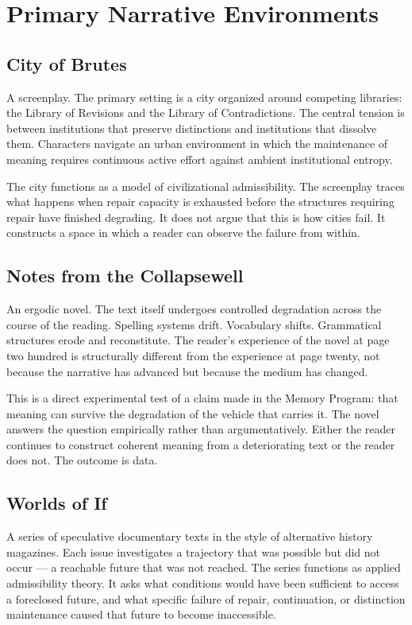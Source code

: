 \documentclass[12pt, openany]{book}
\begin{document}
\section{Primary Narrative Environments}

\subsection{City of Brutes} A screenplay. The primary setting is a city
organized around competing libraries: the Library of Revisions and the
Library of Contradictions. The central tension is between institutions that
preserve distinctions and institutions that dissolve them. Characters
navigate an urban environment in which the maintenance of meaning requires
continuous active effort against ambient institutional entropy.

The city functions as a model of civilizational admissibility. The
screenplay traces what happens when repair capacity is exhausted before
the structures requiring repair have finished degrading. It does not
argue that this is how cities fail. It constructs a space in which a reader
can observe the failure from within.

\subsection{Notes from the Collapsewell} An ergodic novel. The text itself
undergoes controlled degradation across the course of the reading. Spelling
systems drift. Vocabulary shifts. Grammatical structures erode and
reconstitute. The reader's experience of the novel at page two hundred
is structurally different from the experience at page twenty, not because
the narrative has advanced but because the medium has changed.

This is a direct experimental test of a claim made in the Memory Program:
that meaning can survive the degradation of the vehicle that carries it.
The novel answers the question empirically rather than argumentatively.
Either the reader continues to construct coherent meaning from a
deteriorating text or the reader does not. The outcome is data.

\subsection{Worlds of If} A series of speculative documentary texts in the
style of alternative history magazines. Each issue investigates a trajectory
that was possible but did not occur — a reachable future that was not
reached. The series functions as applied admissibility theory. It asks
what conditions would have been sufficient to access a foreclosed future,
and what specific failure of repair, continuation, or distinction
maintenance caused that future to become inaccessible.
\end{document}

